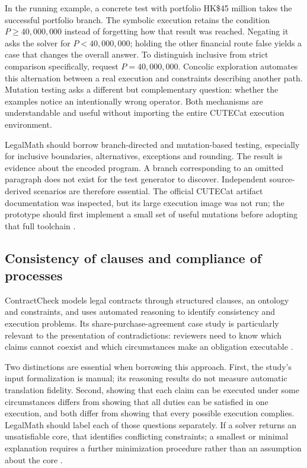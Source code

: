 \documentclass[12pt,a4paper,oneside,openany]{book}
\begin{document}
In the running example, a concrete test with portfolio HK\$45 million takes
the successful portfolio branch. The symbolic execution retains the condition
$P\geq 40{,}000{,}000$ instead of forgetting how that result was reached.
Negating it asks the solver for $P<40{,}000{,}000$; holding the other financial
route false yields a case that changes the overall answer. To distinguish
inclusive from strict comparison specifically, request $P=40{,}000{,}000$.
Concolic exploration automates this alternation between a real execution and
constraints describing another path. Mutation testing asks a different but
complementary question: whether the examples notice an intentionally wrong
operator. Both mechanisms are understandable and useful without importing
the entire CUTECat execution environment.

LegalMath should borrow branch-directed and mutation-based testing, especially
for inclusive boundaries, alternatives, exceptions and rounding. The result is
evidence about the encoded program. A branch corresponding to an omitted
paragraph does not exist for the test generator to discover. Independent
source-derived scenarios are therefore essential. The official CUTECat artifact
documentation was inspected, but its large execution image was not run; the
prototype should first implement a small set of useful mutations before adopting
that full toolchain \citep{libraryreview}.

\subsection{Consistency of clauses and compliance of processes}
\label{merge:P-02-literature:06}


ContractCheck models legal contracts through structured clauses, an ontology and
constraints, and uses automated reasoning to identify consistency and execution
problems. Its share-purchase-agreement case study is particularly relevant to
the presentation of contradictions: reviewers need to know which claims cannot
coexist and which circumstances make an obligation executable
\citep[secs.~3--7]{contractcheck2025}.

Two distinctions are essential when borrowing this approach. First, the study's
input formalization is manual; its reasoning results do not measure automatic
translation fidelity. Second, showing that each claim can be executed under
some circumstances differs from showing that all duties can be satisfied in one
execution, and both differ from showing that every possible execution complies.
LegalMath should label each of those questions separately. If a solver returns
an unsatisfiable core, that identifies conflicting constraints; a smallest or
minimal explanation requires a further minimization procedure rather than an
assumption about the core \citep[secs.~4--5, 8]{contractcheck2025}.
\end{document}

